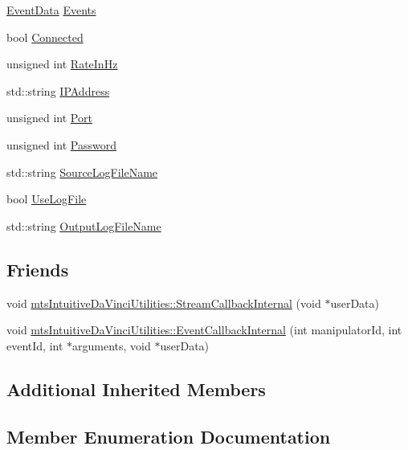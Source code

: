 \begin{DoxyCompactItemize}
\item 
\hyperlink{classmts_intuitive_da_vinci_1_1_event_data}{Event\+Data} \hyperlink{classmts_intuitive_da_vinci_adbe39e510898b80b04aac001722dc6fd}{Events}
\item 
bool \hyperlink{classmts_intuitive_da_vinci_a92486c3be7e1f07ef72df2f00556a5c7}{Connected}
\item 
unsigned int \hyperlink{classmts_intuitive_da_vinci_a1780b24f6582c60ff94f2e1d03ef7060}{Rate\+In\+Hz}
\item 
std\+::string \hyperlink{classmts_intuitive_da_vinci_aa5fb5d66628f24155b54300b3b3ed2b2}{I\+P\+Address}
\item 
unsigned int \hyperlink{classmts_intuitive_da_vinci_a62f779011990ec7e02ddc7800d933e23}{Port}
\item 
unsigned int \hyperlink{classmts_intuitive_da_vinci_a91a1a1c9fd5b0e0717257aa00c29c687}{Password}
\item 
std\+::string \hyperlink{classmts_intuitive_da_vinci_abd697468b4bd68e40664e73ca6af5692}{Source\+Log\+File\+Name}
\item 
bool \hyperlink{classmts_intuitive_da_vinci_a19a2398dbc1a8369da7295119fb8abbc}{Use\+Log\+File}
\item 
std\+::string \hyperlink{classmts_intuitive_da_vinci_a15ff830a81df5f1a4567de780f88e929}{Output\+Log\+File\+Name}
\end{DoxyCompactItemize}
\subsection*{Friends}
\begin{DoxyCompactItemize}
\item 
void \hyperlink{classmts_intuitive_da_vinci_ad910bb121d5d461c63287b041e77cae0}{mts\+Intuitive\+Da\+Vinci\+Utilities\+::\+Stream\+Callback\+Internal} (void $\ast$user\+Data)
\item 
void \hyperlink{classmts_intuitive_da_vinci_ac72f3d23f2cccf30b98148161cda75e5}{mts\+Intuitive\+Da\+Vinci\+Utilities\+::\+Event\+Callback\+Internal} (int manipulator\+Id, int event\+Id, int $\ast$arguments, void $\ast$user\+Data)
\end{DoxyCompactItemize}
\subsection*{Additional Inherited Members}


\subsection{Member Enumeration Documentation}
\hypertarget{classmts_intuitive_da_vinci_a32a63e2057b2c00c8f08685f8f5736f4}{}

